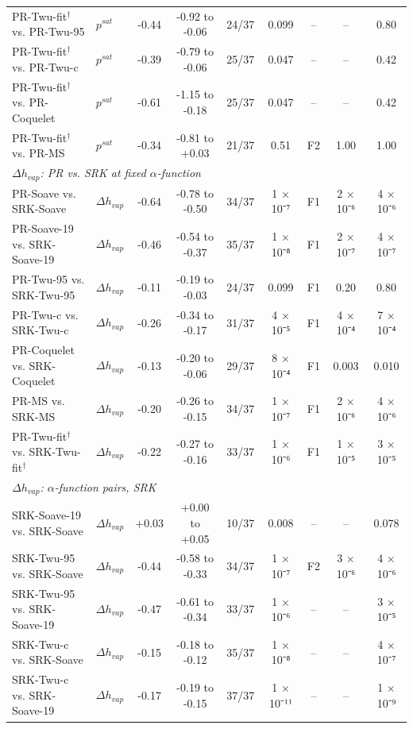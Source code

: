 \begin{table}[H]
\begin{tabular}{llccccccc}
PR-Twu-fit$^{\dagger}$ vs. PR-Twu-95 & $p^{sat}$ & -0.44 & -0.92 to -0.06 & 24/37 & 0.099 & -- & -- & 0.80 \\
PR-Twu-fit$^{\dagger}$ vs. PR-Twu-c & $p^{sat}$ & -0.39 & -0.79 to -0.06 & 25/37 & 0.047 & -- & -- & 0.42 \\
PR-Twu-fit$^{\dagger}$ vs. PR-Coquelet & $p^{sat}$ & -0.61 & -1.15 to -0.18 & 25/37 & 0.047 & -- & -- & 0.42 \\
PR-Twu-fit$^{\dagger}$ vs. PR-MS & $p^{sat}$ & -0.34 & -0.81 to +0.03 & 21/37 & 0.51 & F2 & 1.00 & 1.00 \\
\multicolumn{9}{l}{\emph{$\Delta h_{vap}$: PR vs. SRK at fixed $\alpha$-function}} \\
PR-Soave vs. SRK-Soave & $\Delta h_{vap}$ & -0.64 & -0.78 to -0.50 & 34/37 & 1 × 10⁻⁷ & F1 & 2 × 10⁻⁶ & 4 × 10⁻⁶ \\
PR-Soave-19 vs. SRK-Soave-19 & $\Delta h_{vap}$ & -0.46 & -0.54 to -0.37 & 35/37 & 1 × 10⁻⁸ & F1 & 2 × 10⁻⁷ & 4 × 10⁻⁷ \\
PR-Twu-95 vs. SRK-Twu-95 & $\Delta h_{vap}$ & -0.11 & -0.19 to -0.03 & 24/37 & 0.099 & F1 & 0.20 & 0.80 \\
PR-Twu-c vs. SRK-Twu-c & $\Delta h_{vap}$ & -0.26 & -0.34 to -0.17 & 31/37 & 4 × 10⁻⁵ & F1 & 4 × 10⁻⁴ & 7 × 10⁻⁴ \\
PR-Coquelet vs. SRK-Coquelet & $\Delta h_{vap}$ & -0.13 & -0.20 to -0.06 & 29/37 & 8 × 10⁻⁴ & F1 & 0.003 & 0.010 \\
PR-MS vs. SRK-MS & $\Delta h_{vap}$ & -0.20 & -0.26 to -0.15 & 34/37 & 1 × 10⁻⁷ & F1 & 2 × 10⁻⁶ & 4 × 10⁻⁶ \\
PR-Twu-fit$^{\dagger}$ vs. SRK-Twu-fit$^{\dagger}$ & $\Delta h_{vap}$ & -0.22 & -0.27 to -0.16 & 33/37 & 1 × 10⁻⁶ & F1 & 1 × 10⁻⁵ & 3 × 10⁻⁵ \\
\multicolumn{9}{l}{\emph{$\Delta h_{vap}$: $\alpha$-function pairs, SRK}} \\
SRK-Soave-19 vs. SRK-Soave & $\Delta h_{vap}$ & +0.03 & +0.00 to +0.05 & 10/37 & 0.008 & -- & -- & 0.078 \\
SRK-Twu-95 vs. SRK-Soave & $\Delta h_{vap}$ & -0.44 & -0.58 to -0.33 & 34/37 & 1 × 10⁻⁷ & F2 & 3 × 10⁻⁶ & 4 × 10⁻⁶ \\
SRK-Twu-95 vs. SRK-Soave-19 & $\Delta h_{vap}$ & -0.47 & -0.61 to -0.34 & 33/37 & 1 × 10⁻⁶ & -- & -- & 3 × 10⁻⁵ \\
SRK-Twu-c vs. SRK-Soave & $\Delta h_{vap}$ & -0.15 & -0.18 to -0.12 & 35/37 & 1 × 10⁻⁸ & -- & -- & 4 × 10⁻⁷ \\
SRK-Twu-c vs. SRK-Soave-19 & $\Delta h_{vap}$ & -0.17 & -0.19 to -0.15 & 37/37 & 1 × 10⁻¹¹ & -- & -- & 1 × 10⁻⁹ \\

\end{tabular}
\end{table}

